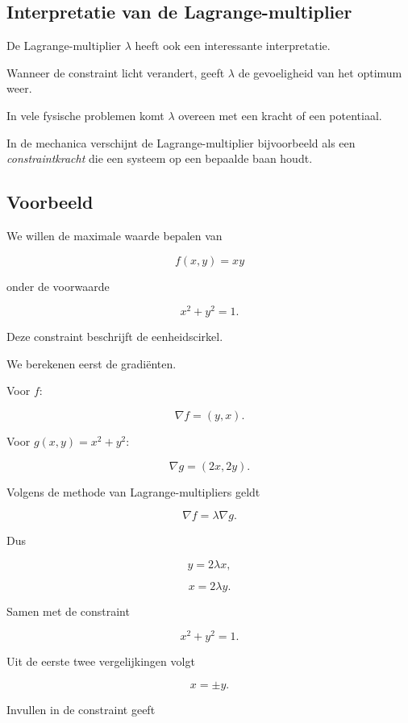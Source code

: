 \documentclass[11pt,a4paper]{article}
\begin{document}
    \subsection{Interpretatie van de Lagrange-multiplier}

    De Lagrange-multiplier $\lambda$ heeft ook een interessante interpretatie.

    Wanneer de constraint licht verandert, geeft $\lambda$
    de gevoeligheid van het optimum weer.

    In vele fysische problemen komt $\lambda$ overeen met een
    kracht of een potentiaal.

    In de mechanica verschijnt de Lagrange-multiplier bijvoorbeeld
    als een \textit{constraintkracht} die een systeem op een bepaalde
    baan houdt.

    \subsection{Voorbeeld}

    We willen de maximale waarde bepalen van

    \[
        f(x,y) = xy
    \]

    onder de voorwaarde

    \[
        x^2 + y^2 = 1.
    \]

    Deze constraint beschrijft de eenheidscirkel.

    We berekenen eerst de gradiënten.

    Voor $f$:

    \[
        \nabla f = (y,x).
    \]

    Voor $g(x,y) = x^2 + y^2$:

    \[
        \nabla g = (2x,2y).
    \]

    Volgens de methode van Lagrange-multipliers geldt

    \[
        \nabla f = \lambda \nabla g.
    \]

    Dus

    \[
        y = 2\lambda x,
    \]

    \[
        x = 2\lambda y.
    \]

    Samen met de constraint

    \[
        x^2 + y^2 = 1.
    \]

    Uit de eerste twee vergelijkingen volgt

    \[
        x = \pm y.
    \]

    Invullen in de constraint geeft
\end{document}
